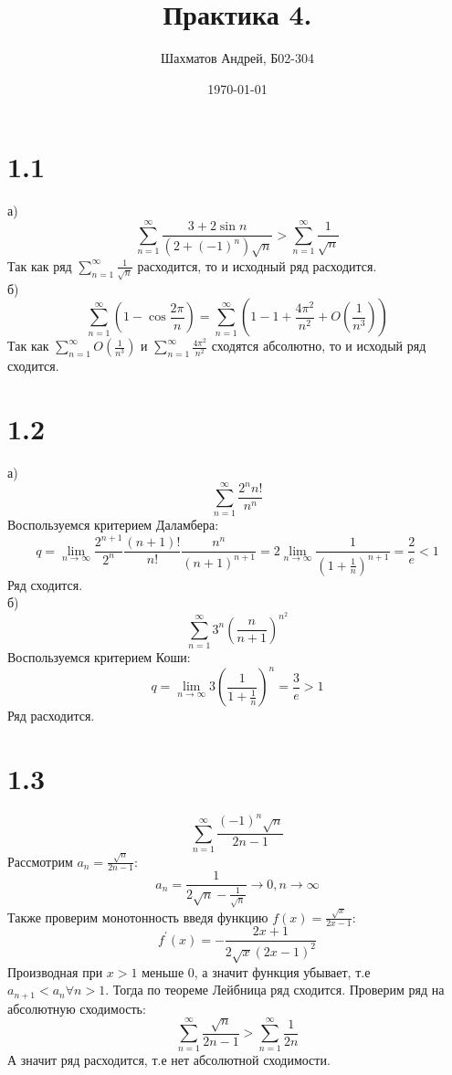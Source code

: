 \documentclass[12pt]{article}
\title{Практика 4.}
\author{Шахматов Андрей, Б02-304}
\date{\today}
\begin{document}
\maketitle
\tableofcontents

\section{1.1}
а) 
\[
    \sum_{n=1}^{\infty} \frac{3 + 2 \sin n}{(2 + (-1)^n)\sqrt{n}} > \sum_{n=1}^{\infty} \frac{1}{\sqrt{n}}
\]
Так как ряд $\sum_{n=1}^{\infty} \frac{1}{\sqrt{n} }$ расходится, то и исходный ряд расходится. 
\\ б) 
\[
    \sum_{n=1}^{\infty} \left( 1 - \cos \frac{2\pi}{n} \right) = \sum_{n=1}^{\infty} \left( 1 - 1 + \frac{4\pi^2}{n^2} + O(\frac{1}{n^3}) \right) 
\]
Так как $\sum_{n=1}^{\infty} O(\frac{1}{n^3})$ и $\sum_{n=1}^{\infty} \frac{4\pi^2}{n^2}$ сходятся абсолютно, то и исходый ряд сходится.  
\section{1.2}
а)
\[
    \sum_{n=1}^{\infty} \frac{2^n n!}{n^n}
\]
Воспользуемся критерием Даламбера:
\[
    q = \lim_{n \to \infty}  \frac{2^{n+1}}{2^n} \frac{(n+1)!}{n!} \frac{n^n}{(n+1)^{n+1} } = 2 \lim_{n \to \infty} \frac{1}{\left( 1 + \frac{1}{n} \right)^{n+1} } = \frac{2}{e} < 1
\]
Ряд сходится.
\\
б)
\[
    \sum_{n=1}^{\infty} 3^n \left( \frac{n}{n+1} \right)^{n^2} 
\]
Воспользуемся критерием Коши:
\[
    q = \lim_{n \to \infty} 3 \left( \frac{1}{1 + \frac{1}{n}} \right)^n = \frac{3}{e} > 1 
\]
Ряд расходится. 
\section{1.3}
\[
    \sum_{n=1}^{\infty} \frac{(-1)^n \sqrt{n} }{2n - 1}
\]
Рассмотрим $a_n = \frac{\sqrt{n} }{2n - 1}$:
\[
    a_n = \frac{1}{2\sqrt{n} - \frac{1}{\sqrt{n} }} \to 0, n \to \infty 
\] 
Также проверим монотонность введя функцию $f(x) = \frac{\sqrt{x} }{2x - 1}$:
\[
    f^{\prime}(x) = -\frac{2x + 1}{2\sqrt{x}(2x-1)^2}
\]
Производная при $x > 1$ меньше 0, а значит функция убывает, т.е $a_{n+1} < a_n \forall n > 1$. 
Тогда по теореме Лейбница ряд сходится. 
Проверим ряд на абсолютную сходимость:
\[
    \sum_{n=1}^{\infty} \frac{\sqrt{n} }{2n - 1} > \sum_{n=1}^{\infty} \frac{1}{2n}
\]
А значит ряд расходится, т.е нет абсолютной сходимости.
\end{document}
